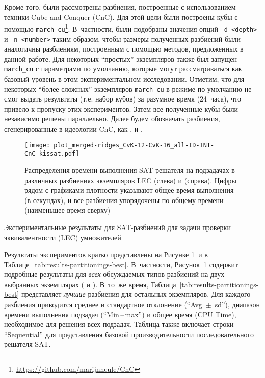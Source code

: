 Кроме того, были рассмотрены разбиения, построенные с использованием техники Cube-and-Conquer (CnC).
Для этой цели были построены кубы с помощью \texttt{march\_cu}\footnote{\url{https://github.com/marijnheule/CnC}}.
В~частности, были подобраны значения опций \texttt{-d <depth>} и \texttt{-n <number>} таким образом, чтобы размеры полученных разбиений были аналогичны разбиениям, построенным с помощью методов, предложенных в данной работе.
Для некоторых \enquote{простых} экземпляров также был запущен \texttt{march\_cu} с параметрами по умолчанию, которые могут рассматриваться как базовый уровень в этом экспериментальном исследовании.
Отметим, что для некоторых \enquote{более сложных} экземпляров \texttt{march\_cu} в режиме по умолчанию не смог выдать результаты (т.е. набор кубов) за разумное время (24~часа), что привело к пропуску этих экспериментов.
Затем все полученные кубы были независимо решены параллельно.
Далее будем обозначать разбиения, сгенерированные в идеологии CnC, как ,  и .

\begin{figure}[!htb]
    \centering
    \texttt{[image: plot\_merged-ridges\_CvK-12-CvK-16\_all-ID-INT-CnC\_kissat.pdf]}
    \caption{Распределения времени выполнения SAT-решателя на подзадачах в различных разбиениях экземпляров LEC  (слева) и  (справа). Цифры рядом с графиками плотности указывают общее время выполнения (в секундах), и все разбиения упорядочены по общему времени (наименьшее время сверху)}
    \label{fig:ridges}
\end{figure}

\begin{table}[p]
    \centering
    \caption{Экспериментальные результаты для SAT-разбиений для задачи проверки эквивалентности (LEC) умножителей}
    \label{tab:results-partitionings-best}
    
\end{table}

Результаты экспериментов кратко представлены на Рисунке \ref{fig:ridges}~и в Таблице~\ref{tab:results-partitionings-best}.
В~частности, Рисунок~\ref{fig:ridges} содержит
подробные результаты для \textit{всех} обсуждаемых типов разбиений на двух выбранных экземплярах ( и ).
В~то~же время, Таблица~\ref{tab:results-partitionings-best} представляет \emph{лучшие} разбиения для остальных экземпляров.
Для каждого разбиения приводится среднее и стандартное отклонение (\enquote{Avg~$\pm$~sd}), диапазон времени выполнения подзадач (\enquote{Min\,--\,max}) и общее  время (CPU Time), необходимое для решения всех подзадач.
Таблица также включает строки \enquote{Sequential} для представления базовой производительности последовательного решателя SAT.


